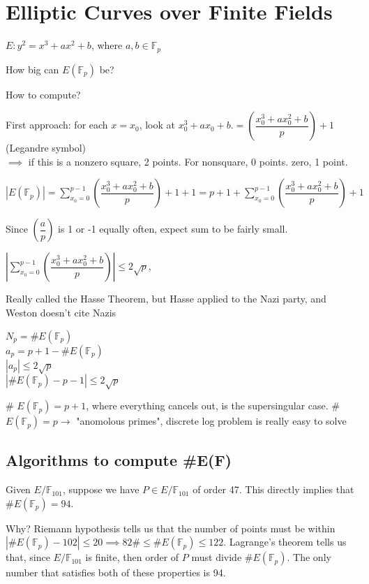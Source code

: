 \documentclass[10pt]{article}
\newcommand{\F}{\mathbb{F}}
\begin{document}
\section{Elliptic Curves over Finite Fields}
$E : y^2 = x^3 + ax^2 + b$, where $a, b \in \F_p$

How big can $E(\F_p)$ be? 

How to compute?

First approach: for each $x = x_0$, look at $x_0^3 + ax_0 + b$.$= \left(\dfrac{x_0^3 + ax_0^2 + b}{p}\right) + 1$ (Legandre symbol)\\$\implies$ if this is a nonzero square, 2 points. For nonsquare, 0 points. zero, 1 point. 

$|E(\F_p)| = \sum\limits_{x_0=0}^{p-1}\left(\dfrac{x_0^3 + ax_0^2 + b}{p}\right) + 1 + 1 = p + 1 + \sum\limits_{x_0=0}^{p-1}\left(\dfrac{x_0^3 + ax_0^2 + b}{p}\right)+ 1$ 

Since $\left(\dfrac{a}{p}\right)$ is 1 or -1 equally often, expect sum to be fairly small.
\begin{thm}
    $|\sum\limits_{x_0=0}^{p-1}\left(\dfrac{x_0^3 + ax_0^2 + b}{p}\right)| \leq 2\sqrt p$, 
\end{thm}
Really called the Hasse Theorem, but Hasse applied to the Nazi party, and Weston doesn't cite Nazis

$N_p = \#E(\F_p)$\\
$a_p = p + 1 - \#E(\F_p)$\\
$|a_p| \leq 2\sqrt{p}$\\
$|\#E(\F_p) - p - 1| \leq 2\sqrt p$

\begin{rmk}
    \# $E(\F_p) = p + 1$, where everything cancels out, is the supersingular case.
    \# $E(\F_p) = p \to$ "anomolous primes", discrete log problem is really easy to solve %
\end{rmk}

\subsection{Algorithms to compute \#E(F)}
Given $E/\F_{101}$, suppose we have $P \in E/\F_{101}$ of order 47. This directly implies that \#$E(\F_p) = 94$.

Why? Riemann hypothesis tells us that the number of points must be within $|\#E(\F_p) - 102| \leq 20 \implies 82 \# \leq \#E(\F_p) \leq 122$. Lagrange's theorem tells us that, since $E/\F_{101}$ is finite, then order of $P$ must divide $\#E(\F_p)$. The only number that satisfies both of these properties is 94.
\end{document}

